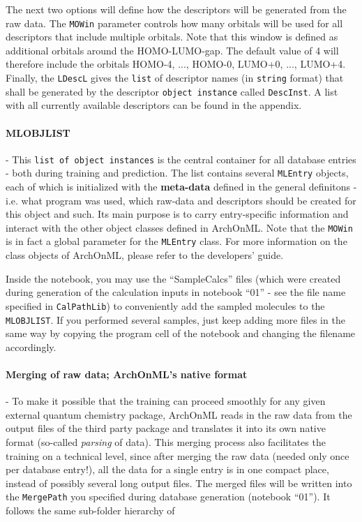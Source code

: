\documentclass[12pt]{achemso}
\begin{document}
\noindent The next two options will define how the descriptors will be generated from the raw data. The \texttt{MOWin} parameter controls how many orbitals will be used for all descriptors that include multiple orbitals. Note that this window is defined as additional orbitals around the HOMO-LUMO-gap. The default value of 4 will therefore include the orbitals HOMO-4, ..., HOMO-0, LUMO+0, ..., LUMO+4. Finally, the \texttt{LDescL} gives the \texttt{list} of descriptor names (in \texttt{string} format) that shall be generated by the descriptor \texttt{object instance} called \texttt{DescInst}. A list with all currently available descriptors can be found in the appendix.

\paragraph{MLOBJLIST} - This \texttt{list of object instances} is the central container for all database entries - both during training and prediction. The list contains several \texttt{MLEntry} objects, each of which is initialized with the \textbf{meta-data} defined in the general definitons - i.e. what program was used, which raw-data and descriptors should be created for this object and such. Its main purpose is to carry entry-specific information and interact with the other object classes defined in ArchOnML. Note that the \texttt{MOWin} is in fact a global parameter for the \texttt{MLEntry} class. For more information on the class objects of ArchOnML, please refer to the developers' guide.

\noindent Inside the notebook, you may use the ``SampleCalcs'' files (which were created during generation of the calculation inputs in notebook ``01'' - see the file name specified in \texttt{CalPathLib}) to conveniently add the sampled molecules to the \texttt{MLOBJLIST}. If you performed several samples, just keep adding more files in the same way by copying the program cell of the notebook and changing the filename accordingly.

\paragraph{Merging of raw data; ArchOnML's native format} - To make it possible that the training can proceed smoothly for any given external quantum chemistry package, ArchOnML reads in the raw data from the output files of the third party package and translates it into its own native format (so-called \textit{parsing} of data). This merging process also facilitates the training on a technical level, since after merging the raw data (needed only once per database entry!), all the data for a single entry is in one compact place, instead of possibly several long output files. The merged files will be written into the \texttt{MergePath} you specified during database generation (notebook ``01''). It follows the same sub-folder hierarchy of  
\end{document}
